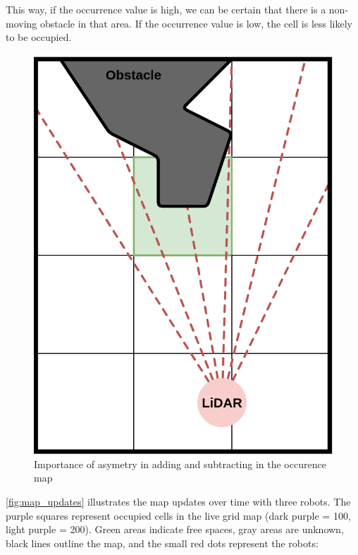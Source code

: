 \documentclass[../main.tex]{subfiles}
\begin{document}
\vspace{1em}

This way, if the occurrence value is high, we can be certain that there is a non-moving obstacle in that area. If the occurrence value is low, the cell is less likely to be occupied.

\begin{figure}[H]
	\centering
	\includegraphics[width=0.4\linewidth]{IMAGES/part5/lidar_occurance_map.png}
	\caption{Importance of asymetry in adding and subtracting in the occurence map}
	\label{fig:lidar_occurence_map}
\end{figure}

\autoref{fig:map_updates} illustrates the map updates over time with three robots. The purple squares represent occupied cells in the live grid map (dark purple = 100, light purple = 200). Green areas indicate free spaces, gray areas are unknown, black lines outline the map, and the small red dots represent the robots:
\end{document}
